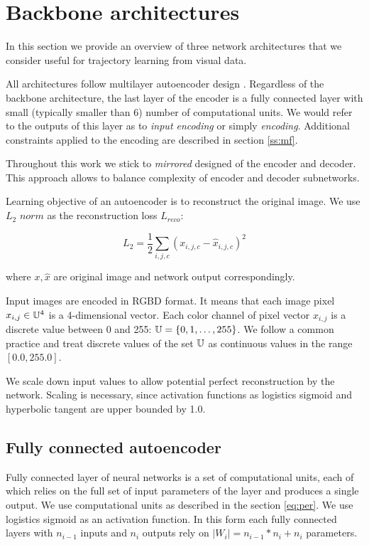 \section{Backbone architectures}

In this section we provide an overview of three network architectures that we consider useful for trajectory learning from visual data.

All architectures follow multilayer autoencoder design \cite{Hinton2006}.
Regardless of the backbone architecture, the last layer of the encoder is a fully connected layer with small (typically smaller than 6) number of computational units.
We would refer to the outputs of this layer as to  \textit{input encoding} or simply \textit{encoding}.
Additional constraints applied to the encoding are described in section \ref{ss:mf}.

Throughout this work we stick to \textit{mirrored} designed of the encoder and decoder.
This approach allows to balance complexity of encoder and decoder subnetworks.

Learning objective of an autoencoder is to reconstruct the original image.
We use $L_2$ $norm$ as the reconstruction loss $L_{reco}$:

\begin{equation}
  L_{2} = \frac{1}{2} \sum_{i, j, c} (x_{i,j,c} - \hat{x}_{i,j,c})^2
\end{equation}

where $x, \hat{x}$ are original image and network output correspondingly.

Input images are encoded in RGBD format. It means that each image pixel $x_{i,j} \in \Bbb{U}^4$ is a 4-dimensional vector.
Each color channel of pixel vector $x_{i,j}$ is a discrete value between 0 and 255: $\Bbb{U} = \{0, 1, \ldots, 255 \}$.
We follow a common practice and treat discrete values of the set $\Bbb{U}$ as continuous values in the range $[0.0, 255.0]$.

We scale down input values to allow potential perfect reconstruction by the network.
Scaling is necessary, since activation functions as logistics sigmoid and hyperbolic tangent are upper bounded by 1.0.


\subsection{Fully connected autoencoder}

Fully connected layer of neural networks is a set of computational units, each of which relies on the full set of input parameters of the layer and produces a single output.
We use computational units as described in the section \ref{eq:per}.
We use logistics sigmoid as an activation function.
In this form each fully connected layers with $n_{i-1}$ inputs and $n_i$ outputs rely on $|W_i|=n_{i-1}*n_i+n_i$ parameters.

